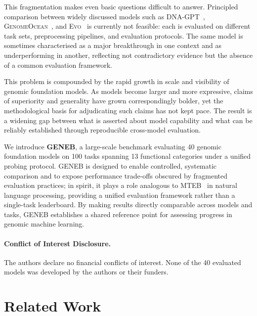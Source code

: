 \documentclass{article}
\theoremstyle{plain}
\theoremstyle{definition}
\theoremstyle{remark}
\begin{document}
This fragmentation makes even basic questions difficult to answer.
Principled comparison between widely discussed models such as
\textsc{DNA-GPT}~\cite{zhang2023dnagptgeneralizedpretrainedtool}, \textsc{GenomeOcean}~\cite{Zhou2025.01.30.635558}, and 
\textsc{Evo}~\cite{nguyen2024sequence} is currently not feasible: each is evaluated on different task
sets, preprocessing pipelines, and evaluation protocols. The same
model is sometimes characterised as a major breakthrough in one
context and as underperforming in another, reflecting not contradictory
evidence but the absence of a common evaluation framework. 

This problem is compounded by the rapid growth in scale and 
visibility of genomic foundation models. As models become larger 
and more expressive, claims of superiority and generality have grown 
correspondingly bolder, yet the methodological basis for adjudicating 
such claims has not kept pace. The result is a widening gap between 
what is asserted about model capability and what can be reliably 
established through reproducible cross-model evaluation.

We introduce \textbf{GENEB}, a large-scale benchmark evaluating 40
genomic foundation models on 100 tasks spanning 13 functional
categories under a unified probing protocol. GENEB is designed to
enable controlled, systematic comparison and to expose performance
trade-offs obscured by fragmented evaluation practices; in spirit, it
plays a role analogous to MTEB~\citep{muennighoff2023mtebmassivetextembedding}
in natural language processing, providing a unified evaluation
framework rather than a single-task leaderboard. By making results
directly comparable across models and tasks, GENEB establishes a
shared reference point for assessing progress in genomic machine
learning.

\paragraph{Conflict of Interest Disclosure.}
The authors declare no financial conflicts of interest. None of the
40 evaluated models was developed by the authors or their funders.

\section{Related Work}

\end{document}
